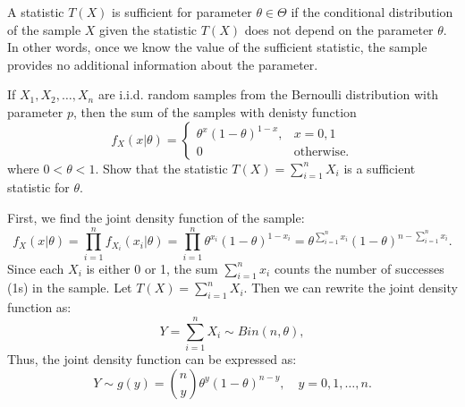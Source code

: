 \begin{definition}[Sufficiency]
    A statistic $T(X)$ is sufficient for parameter $\theta \in \Theta$ if 
    the conditional distribution of the sample $X$ given the statistic $T(X)$ 
    does not depend on the parameter $\theta$.
    In other words, once we know the value of the sufficient statistic, 
    the sample provides no additional information about the parameter.
\end{definition}

\begin{example}
    If $X_1, X_2, \ldots, X_n$ are i.i.d. random samples from the Bernoulli distribution with parameter $p$, then the sum of the samples
    with denisty function
    \[
        f_X(x|\theta) = \begin{cases} 
            \theta^x (1-\theta)^{1-x}, & x = 0, 1\\
            0 & \text{otherwise}.
        \end{cases}
    \]
    where $0 < \theta < 1$. Show that the statistic $T(X) = \sum_{i=1}^n X_i$ is a sufficient statistic for $\theta$.
\end{example}
\begin{solution}
    First, we find the joint density function of the sample:
    \[
        f_X(x|\theta) = \prod_{i=1}^n f_{X_i}(x_i|\theta) = \prod_{i=1}^n \theta^{x_i} (1-\theta)^{1-x_i} = \theta^{\sum_{i=1}^n x_i} (1-\theta)^{n - \sum_{i=1}^n x_i}.
    \]
    Since each $X_i$ is either 0 or 1, the sum $\sum_{i=1}^n x_i$ counts the number of successes (1s) in the sample. Let $T(X) = \sum_{i=1}^n X_i$. Then we can rewrite the joint density function as:
    \[
        Y = \sum_{i=1}^n X_i \sim Bin(n, \theta),
    \]
    Thus, the joint density function can be expressed as:
    \[
        Y \sim g(y) = {n \choose y} \theta^y (1-\theta)^{n-y}, \quad y = 0, 1, \ldots, n.
    \]
\end{solution}

